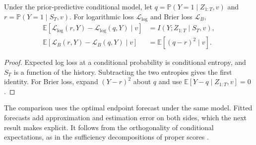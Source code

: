\documentclass[runningheads]{llncs}
\newcommand{\E}{\mathbb E}
\newcommand{\Prob}{\mathbb P}
\begin{document}
\begin{proposition}
\label{prop:history-value}
Under the prior-predictive conditional model, let $q=\Prob(Y=1\mid Z_{1:T},v)$ and $r=\Prob(Y=1\mid S_T,v)$. For logarithmic loss $\mathcal L_{\log}$ and Brier loss $\mathcal L_B$,
\begin{align*}
 \E[\mathcal L_{\log}(r,Y)-\mathcal L_{\log}(q,Y)\mid v]&= I(Y;Z_{1:T}\mid S_T,v),\\
 \E[\mathcal L_B(r,Y)-\mathcal L_B(q,Y)\mid v]&=\E[(q-r)^2\mid v].
\end{align*}
\end{proposition}
\begin{proof}
Expected log loss at a conditional probability is conditional entropy, and $S_T$ is a function of the history. Subtracting the two entropies gives the first identity. For Brier loss, expand $(Y-r)^2$ about $q$ and use $\E[Y-q\mid Z_{1:T},v]=0$.
\end{proof}
The comparison uses the optimal endpoint forecast under the same model. Fitted forecasts add approximation and estimation error on both sides, which the next result makes explicit. It follows from the orthogonality of conditional expectations, as in the sufficiency decompositions of proper scores \cite{broecker2009reliability}.
\end{document}
